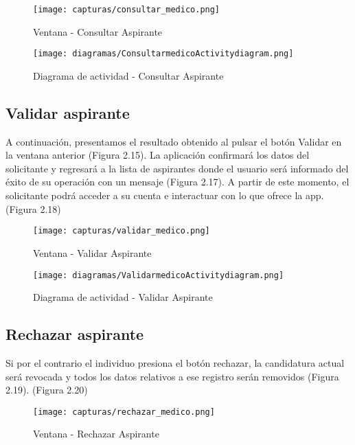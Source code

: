 \documentclass[11pt,spanish,
		listoftables,listoffigures]
		{tfgplantilla}
\begin{document}
\begin{figure}[H]
\centering
\texttt{[image: capturas/consultar\_medico.png]}
\caption{Ventana -  Consultar Aspirante}
\end{figure}

\begin{figure}[H]
\centering
\texttt{[image: diagramas/ConsultarmedicoActivitydiagram.png]}
\caption{Diagrama de actividad -  Consultar Aspirante}
\end{figure}

\vfill
\subsection {Validar aspirante}

A continuación, presentamos el resultado obtenido al pulsar el botón \textquotedbl Validar\textquotedbl{} en la ventana anterior (Figura 2.15). La aplicación confirmará los datos del solicitante y regresará a la lista de aspirantes donde el usuario será informado del éxito de su operación con un mensaje (Figura 2.17). A partir de este momento, el solicitante podrá acceder a su cuenta e interactuar con lo que ofrece la app. (Figura 2.18)

\begin{figure}[H]
\centering
\texttt{[image: capturas/validar\_medico.png]}
\caption{Ventana -  Validar Aspirante}
\end{figure}

\begin{figure}[H]
\centering
\texttt{[image: diagramas/ValidarmedicoActivitydiagram.png]}
\caption{Diagrama de actividad -  Validar Aspirante}
\end{figure}

\vfill
\subsection {Rechazar aspirante}

Si por el contrario el individuo presiona el botón rechazar, la candidatura actual será revocada y todos los datos relativos a ese registro serán removidos (Figura 2.19). (Figura 2.20)

\begin{figure}[H]
\centering
\texttt{[image: capturas/rechazar\_medico.png]}
\caption{Ventana -  Rechazar Aspirante}
\end{figure}
\end{document}
